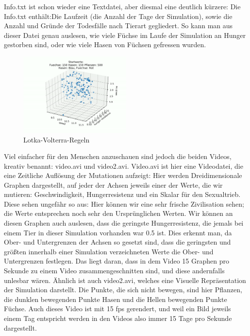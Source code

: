 \documentclass[12pt]{article}
\begin{document}
    Info.txt ist schon wieder eine Textdatei, aber diesmal eine deutlich kürzere:
        Die Info.txt enthält:Die Laufzeit (die Anzahl der Tage der
        Simulation), sowie die Anzahl und Gründe der Todesfälle nach Tierart gegliedert. So kann man aus dieser Datei genau auslesen, wie viele Füchse im Laufe
        der Simulation an Hunger gestorben sind, oder wie viele Hasen von Füchsen
gefressen wurden.
\newpage
\begin{figure}
        \centering
        \includegraphics[width=0.5\textwidth]{stillframe.PNG}
        \caption{Lotka-Volterra-Regeln \label{overflow}}
\end{figure}

Viel einfacher für den Menschen anzuschauen sind jedoch die beiden Videos, kreativ benannt: video.avi und video2.avi. Video.avi ist hier eine Videodatei, die eine Zeitliche Auflösung der Mutationen aufzeigt: Hier werden Dreidimensionale Graphen dargestellt, auf jeder der Achsen jeweils einer der Werte, die wir mutieren: Geschwindigkeit, Hungerresistenz und ein
        Skalar für den Sexualtrieb. Diese sehen ungefähr
        so aus:
        Hier können wir eine sehr frische Zivilisation
        sehen; die Werte entsprechen noch sehr den
        Ursprünglichen Werten. Wir können an diesen
        Graphen auch auslesen, dass die geringste
        Hungerresistenz, die jemals bei einem Tier in
        dieser Simulation vorhanden war 0.5 ist. Dies
        erkennt man, da Ober- und Untergrenzen der
        Achsen so gesetzt sind, dass die geringsten und größten innerhalb einer Simulation
        verzeichneten Werte die Ober- und Untergrenzen festlegen. Das liegt daran, dass in
        dem Video 15 Graphen pro Sekunde zu einem Video zusammengeschnitten sind, und
        diese andernfalls unlesbar wären.
        Ähnlich ist auch video2.avi, welches eine Visuelle Repräsentation der Simulation
        darstellt. Die Punkte, die sich nicht bewegen, sind hier Pflanzen, die dunklen
        bewegenden Punkte Hasen und die Hellen bewegenden Punkte Füchse. Auch dieses
        Video ist mit 15 fps gerendert, und weil ein Bild jeweils einem Tag entspricht
        werden in den Videos also immer 15 Tage pro Sekunde dargestellt.
\end{document}
